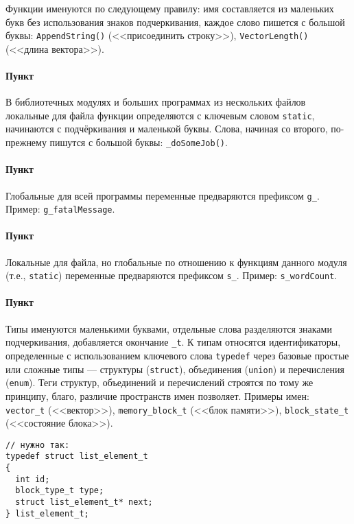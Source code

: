 Функции именуются по следующему правилу: имя составляется из маленьких
букв без использования знаков подчеркивания, каждое слово пишется с
большой буквы: \texttt{AppendString()} (<<присоединить строку>>),
\texttt{VectorLength()} (<<длина вектора>>).

\paragraph{Пункт}

В библиотечных модулях и больших программах из нескольких файлов
локальные для файла функции определяются с ключевым словом
\texttt{static}, начинаются с подчёркивания и маленькой буквы. Слова,
начиная со второго, по-прежнему пишутся с большой буквы:
\texttt{\_doSomeJob()}.

\paragraph{Пункт}

Глобальные для всей программы переменные предваряются префиксом
\texttt{g\_}. Пример: \texttt{g\_fatalMessage}.

\paragraph{Пункт}

Локальные для файла, но глобальные по отношению к функциям данного
модуля (т.е., \texttt{static}) переменные предваряются префиксом
\texttt{s\_}. Пример: \linebreak \texttt{s\_wordCount}.

\paragraph{Пункт}

Типы именуются маленькими буквами, отдельные слова разделяются знаками
подчеркивания, добавляется окончание \texttt{\_t}. К типам относятся
идентификаторы, определенные с использованием ключевого слова
\texttt{typedef} через базовые простые или сложные типы --- структуры
(\texttt{struct}), объединения (\texttt{union}) и перечисления
(\texttt{enum}). Теги структур, объединений и перечислений строятся по
тому же принципу, благо, различие пространств имен позволяет. Примеры
имен: \texttt{vector\_t} (<<вектор>>), \texttt{memory\_block\_t} (<<блок
памяти>>), \texttt{block\_state\_t} (<<состояние блока>>).

\begin{verbatim}
// нужно так:
typedef struct list_element_t
{
  int id;
  block_type_t type;
  struct list_element_t* next;
} list_element_t;
\end{verbatim}

